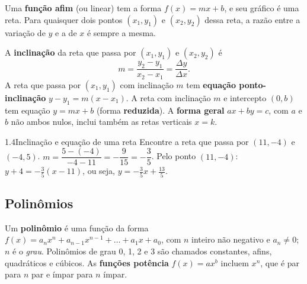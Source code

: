 Uma \textbf{função afim} (ou linear) tem a forma $f(x)=mx+b$, e seu gráfico é uma reta.
Para quaisquer dois pontos $(x_1,y_1)$ e $(x_2,y_2)$ dessa reta, a razão entre a variação
de $y$ e a de $x$ é sempre a mesma.

\begin{definicao}
A \textbf{inclinação} da reta que passa por $(x_1,y_1)$ e $(x_2,y_2)$ é
\[
m=\frac{y_2-y_1}{x_2-x_1}=\frac{\Delta y}{\Delta x}.
\]
A reta que passa por $(x_1,y_1)$ com inclinação $m$ tem \textbf{equação ponto-inclinação}
$y-y_1=m(x-x_1)$. A reta com inclinação $m$ e intercepto $(0,b)$ tem equação
$y=mx+b$ (forma \textbf{reduzida}). A \textbf{forma geral} $ax+by=c$, com $a$ e $b$ não
ambos nulos, inclui também as retas verticais $x=k$.
\end{definicao}

\begin{exemplo}{1.4}{Inclinação e equação de uma reta}
Encontre a reta que passa por $(11,-4)$ e $(-4,5)$.
\solucao
$m=\dfrac{5-(-4)}{-4-11}=-\dfrac{9}{15}=-\dfrac35$. Pelo ponto $(11,-4)$:
$y+4=-\tfrac35(x-11)$, ou seja, $y=-\tfrac35x+\tfrac{13}{5}$.
\end{exemplo}

\subsection{Polinômios}

Um \textbf{polinômio} é uma função da forma
$f(x)=a_nx^n+a_{n-1}x^{n-1}+\dots+a_1x+a_0$, com $n$ inteiro não negativo e $a_n\neq0$; $n$
é o \emph{grau}. Polinômios de grau 0, 1, 2 e 3 são chamados constantes, afins,
quadráticos e cúbicos. As \textbf{funções potência} $f(x)=ax^b$ incluem $x^n$, que é par
para $n$ par e ímpar para $n$ ímpar.


